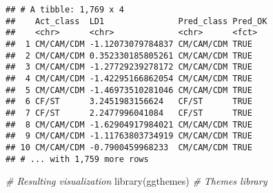 \documentclass[
]{article}
\newenvironment{Shaded}{\begin{snugshade}}{\end{snugshade}}
\newcommand{\AttributeTok}[1]{\textcolor[rgb]{0.77,0.63,0.00}{#1}}
\newcommand{\CommentTok}[1]{\textcolor[rgb]{0.56,0.35,0.01}{\textit{#1}}}
\newcommand{\ConstantTok}[1]{\textcolor[rgb]{0.00,0.00,0.00}{#1}}
\newcommand{\FunctionTok}[1]{\textcolor[rgb]{0.00,0.00,0.00}{#1}}
\newcommand{\NormalTok}[1]{#1}
\newcommand{\OtherTok}[1]{\textcolor[rgb]{0.56,0.35,0.01}{#1}}
\newcommand{\SpecialCharTok}[1]{\textcolor[rgb]{0.00,0.00,0.00}{#1}}
\newcommand{\StringTok}[1]{\textcolor[rgb]{0.31,0.60,0.02}{#1}}
\begin{document}
\begin{Shaded}
\end{Shaded}

\begin{verbatim}
## # A tibble: 1,769 x 4
##    Act_class  LD1               Pred_class Pred_OK
##    <chr>      <chr>             <chr>      <fct>  
##  1 CM/CAM/CDM -1.12073079784837 CM/CAM/CDM TRUE   
##  2 CM/CAM/CDM 0.352330185805261 CM/CAM/CDM TRUE   
##  3 CM/CAM/CDM -1.27729239278172 CM/CAM/CDM TRUE   
##  4 CM/CAM/CDM -1.42295166862054 CM/CAM/CDM TRUE   
##  5 CM/CAM/CDM -1.46973510281046 CM/CAM/CDM TRUE   
##  6 CF/ST      3.2451983156624   CF/ST      TRUE   
##  7 CF/ST      2.2477996041084   CF/ST      TRUE   
##  8 CM/CAM/CDM -1.62904917984021 CM/CAM/CDM TRUE   
##  9 CM/CAM/CDM -1.11763803734919 CM/CAM/CDM TRUE   
## 10 CM/CAM/CDM -0.7900459968233  CM/CAM/CDM TRUE   
## # ... with 1,759 more rows
\end{verbatim}

\begin{Shaded}
\begin{Highlighting}[]
\CommentTok{\# Resulting visualization}
\FunctionTok{library}\NormalTok{(ggthemes)   }\CommentTok{\# Themes library}
\end{Highlighting}
\end{Shaded}
\end{document}
